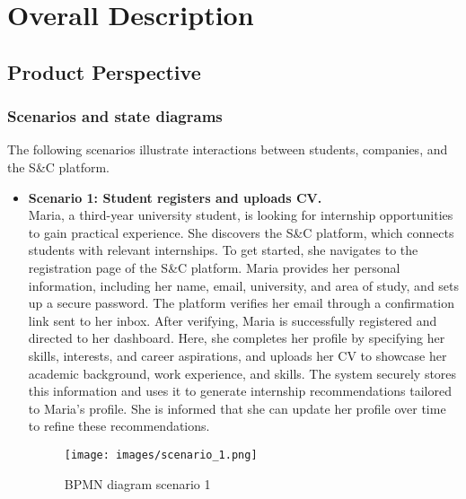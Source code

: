 \section{Overall Description}
\subsection{Product Perspective}

\subsubsection{Scenarios and state diagrams}
The following scenarios illustrate interactions between students, companies, and the S\&C platform.

\begin{itemize}
    \item \textbf{Scenario 1: Student registers and uploads CV.}  \\
    Maria, a third-year university student, is looking for internship opportunities to gain practical experience. She discovers the S\&C platform, which connects students with relevant internships. To get started, she navigates to the registration page of the S\&C platform. Maria provides her personal information, including her name, email, university, and area of study, and sets up a secure password. The platform verifies her email through a confirmation link sent to her inbox. After verifying, Maria is successfully registered and directed to her dashboard. Here, she completes her profile by specifying her skills, interests, and career aspirations, and uploads her CV to showcase her academic background, work experience, and skills. The system securely stores this information and uses it to generate internship recommendations tailored to Maria’s profile. She is informed that she can update her profile over time to refine these recommendations.

    \begin{figure}[!ht]
    \centering
    \texttt{[image: images/scenario\_1.png]}
    \caption{BPMN diagram scenario 1}
    \end{figure}


\end{itemize}
